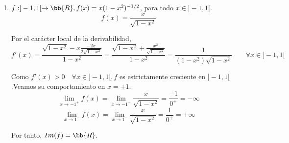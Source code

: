 \begin{ejercicio}
\begin{enumerate}
        \item $f:]-1,1[\to \bb{R}, f(x)=x(1-x^2)^{-1/2}$, para todo $x\in]-1,1[$.
        $$f(x) = \frac{x}{\sqrt{1-x^2}}$$

        Por el carácter local de la derivabilidad,
        $$f'(x)=\frac{\sqrt{1-x^2}-x\frac{-2x}{2\sqrt{1-x^2}}}{1-x^2} = \frac{\sqrt{1-x^2}+\frac{x^2}{\sqrt{1-x^2}}}{1-x^2} = \frac{1}{(1-x^2)\sqrt{1-x^2}} \qquad \forall x \in ]-1,1[$$

        Como $f'(x)>0\quad \forall x \in ]-1,1[, f$ es estrictamente creciente en $]-1,1[$.Veamos su comportamiento en $x=\pm1$.
        \begin{equation*}
            \lim_{x \to -1^+} f(x) = \lim_{x \to -1^+} \frac{x}{\sqrt{1-x^2}} = \frac{-1}{0^+} = -\infty
        \end{equation*}
        \begin{equation*}
            \lim_{x \to 1^-} f(x) = \lim_{x \to 1^-} \frac{x}{\sqrt{1-x^2}} = \frac{1}{0^+} = +\infty
        \end{equation*}

        Por tanto, $Im(f)=\bb{R}$.
    \end{enumerate}
\end{ejercicio}

